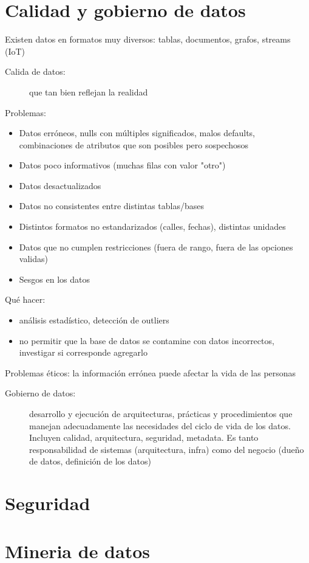 \section{Calidad y gobierno de datos}

Existen datos en formatos muy diversos: tablas, documentos, grafos, streams (IoT)

\begin{description}
	\item[Calida de datos:] que tan bien reflejan la realidad
\end{description}

Problemas:

\begin{itemize}
	\item Datos erróneos, nulls con múltiples significados, malos defaults, combinaciones de atributos que son posibles pero sospechosos
	\item Datos poco informativos (muchas filas con valor "otro")
	\item Datos desactualizados
	\item Datos no consistentes entre distintas tablas/bases
	\item Distintos formatos no estandarizados (calles, fechas), distintas unidades
	\item Datos que no cumplen restricciones (fuera de rango, fuera de las opciones validas)
	\item Sesgos en los datos
\end{itemize}

Qué hacer:

\begin{itemize}
	\item análisis estadístico, detección de outliers
	\item no permitir que la base de datos se contamine con datos incorrectos, investigar si corresponde agregarlo
\end{itemize}

Problemas éticos: la información errónea puede afectar la vida de las personas

\begin{description}
	\item[Gobierno de datos:] desarrollo y ejecución de arquitecturas, prácticas y procedimientos que manejan adecuadamente las necesidades del ciclo de vida de los datos. Incluyen calidad, arquitectura, seguridad, metadata. Es tanto responsabilidad de sistemas (arquitectura, infra) como del negocio (dueño de datos, definición de los datos)
\end{description}

\section{Seguridad}

\section{Mineria de datos}
